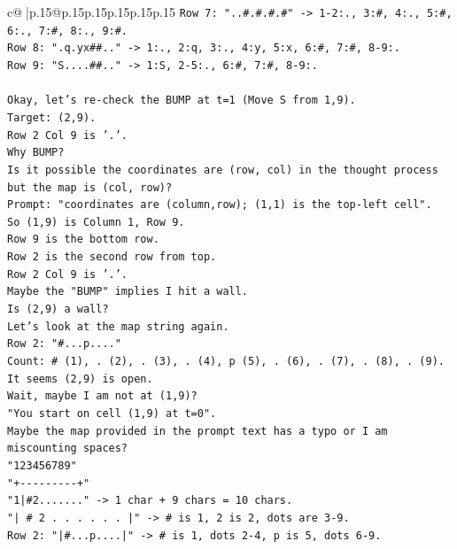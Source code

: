 \documentclass{article}
\begin{document}
{\begin{supertabular}{c@{$\;$}|p{.15\linewidth}@{}p{.15\linewidth}p{.15\linewidth}p{.15\linewidth}p{.15\linewidth}p{.15\linewidth}}
{{{\texttt{Row 7: "..\#.\#.\#.\#" {-}> 1{-}2:., 3:\#, 4:., 5:\#, 6:., 7:\#, 8:., 9:\#.} \\
\texttt{Row 8: ".q.yx\#\#.." {-}> 1:., 2:q, 3:., 4:y, 5:x, 6:\#, 7:\#, 8{-}9:.} \\
\texttt{Row 9: "S....\#\#.." {-}> 1:S, 2{-}5:., 6:\#, 7:\#, 8{-}9:.} \\
\\ 
\texttt{Okay, let's re{-}check the BUMP at t=1 (Move S from 1,9).} \\
\texttt{Target: (2,9).} \\
\texttt{Row 2 Col 9 is '.'.} \\
\texttt{Why BUMP?} \\
\texttt{Is it possible the coordinates are (row, col) in the thought process but the map is (col, row)?} \\
\texttt{Prompt: "coordinates are (column,row); (1,1) is the top{-}left cell".} \\
\texttt{So (1,9) is Column 1, Row 9.} \\
\texttt{Row 9 is the bottom row.} \\
\texttt{Row 2 is the second row from top.} \\
\texttt{Row 2 Col 9 is '.'.} \\
\texttt{Maybe the "BUMP" implies I hit a wall.} \\
\texttt{Is (2,9) a wall?} \\
\texttt{Let's look at the map string again.} \\
\texttt{Row 2: "\#...p...."} \\
\texttt{Count: \# (1), . (2), . (3), . (4), p (5), . (6), . (7), . (8), . (9).} \\
\texttt{It seems (2,9) is open.} \\
\texttt{Wait, maybe I am not at (1,9)?} \\
\texttt{"You start on cell (1,9) at t=0".} \\
\texttt{Maybe the map provided in the prompt text has a typo or I am miscounting spaces?} \\
\texttt{"123456789"} \\
\texttt{"+{-}{-}{-}{-}{-}{-}{-}{-}{-}+"} \\
\texttt{"1|\#2......." {-}> 1 char + 9 chars = 10 chars.} \\
\texttt{"| \# 2 . . . . . . |" {-}> \# is 1, 2 is 2, dots are 3{-}9.} \\
\texttt{Row 2: "|\#...p....|" {-}> \# is 1, dots 2{-}4, p is 5, dots 6{-}9.} \\
}}}
\end{supertabular}}
\end{document}
